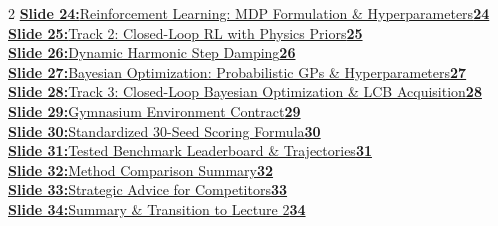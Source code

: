 \documentclass[11pt,a4paper]{article}
\begin{document}
{\begin{multicols}{2}
\noindent\hyperlink{slide.24}{\textbf{\color{primaryblue}Slide 24:}\enspace Reinforcement Learning: MDP Formulation \& Hyperparameters\enspace\dotfill\enspace\textbf{24}} \\[0.22em]
\noindent\hyperlink{slide.25}{\textbf{\color{primaryblue}Slide 25:}\enspace Track 2: Closed-Loop RL with Physics Priors\enspace\dotfill\enspace\textbf{25}} \\[0.22em]
\noindent\hyperlink{slide.26}{\textbf{\color{primaryblue}Slide 26:}\enspace Dynamic Harmonic Step Damping\enspace\dotfill\enspace\textbf{26}} \\[0.22em]
\noindent\hyperlink{slide.27}{\textbf{\color{primaryblue}Slide 27:}\enspace Bayesian Optimization: Probabilistic GPs \& Hyperparameters\enspace\dotfill\enspace\textbf{27}} \\[0.22em]
\noindent\hyperlink{slide.28}{\textbf{\color{primaryblue}Slide 28:}\enspace Track 3: Closed-Loop Bayesian Optimization \& LCB Acquisition\enspace\dotfill\enspace\textbf{28}} \\[0.22em]
\noindent\hyperlink{slide.29}{\textbf{\color{primaryblue}Slide 29:}\enspace Gymnasium Environment Contract\enspace\dotfill\enspace\textbf{29}} \\[0.22em]
\noindent\hyperlink{slide.30}{\textbf{\color{primaryblue}Slide 30:}\enspace Standardized 30-Seed Scoring Formula\enspace\dotfill\enspace\textbf{30}} \\[0.22em]
\noindent\hyperlink{slide.31}{\textbf{\color{primaryblue}Slide 31:}\enspace Tested Benchmark Leaderboard \& Trajectories\enspace\dotfill\enspace\textbf{31}} \\[0.22em]
\noindent\hyperlink{slide.32}{\textbf{\color{primaryblue}Slide 32:}\enspace Method Comparison Summary\enspace\dotfill\enspace\textbf{32}} \\[0.22em]
\noindent\hyperlink{slide.33}{\textbf{\color{primaryblue}Slide 33:}\enspace Strategic Advice for Competitors\enspace\dotfill\enspace\textbf{33}} \\[0.22em]
\noindent\hyperlink{slide.34}{\textbf{\color{primaryblue}Slide 34:}\enspace Summary \& Transition to Lecture 2\enspace\dotfill\enspace\textbf{34}} \\[0.22em]
\end{multicols}}

\clearpage
{}
\setcounter{page}{1}
\end{document}
